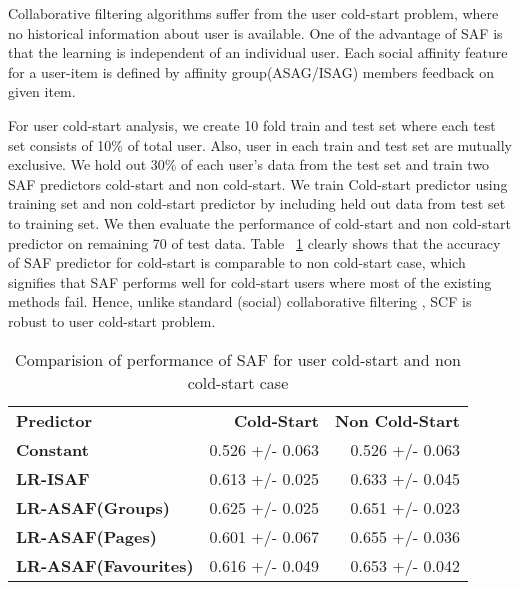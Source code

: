 Collaborative filtering algorithms suffer from the user cold-start problem,
where no historical information about user is available. One of the advantage of SAF is that 
the learning is independent of an individual user. Each social affinity feature for a user-item is
defined by affinity group(ASAG/ISAG) members feedback on given item. 

For user cold-start analysis, we create 10 fold train and test set where each test set
consists of 10\% of total user. Also, user in each train and test set are mutually exclusive.
We hold out 30\% of each user's data from the test set and train two SAF predictors cold-start and non cold-start.
We train Cold-start predictor using training set  and non cold-start predictor by including held out data from test
set to training set. We then evaluate the performance of cold-start and non cold-start predictor on remaining 70%
of test data. Table ~\ref{tab:coldstart} clearly shows that the accuracy of  SAF predictor for cold-start is comparable
to non cold-start case, which signifies that SAF performs well for cold-start users where most of the
existing methods fail. Hence, unlike standard (social) collaborative filtering , SCF is robust to user 
cold-start problem.  

 
\begin{table}[t!]
\centering
\begin{tabular}{|>{\small}l|>{\small}r|>{\small}r|}
\hline
& \multicolumn{2}{|c|}{\textbf{Accuracy}}\\
\hline
\textbf{Predictor}& \textbf{Cold-Start} & \textbf{Non Cold-Start}\\
\hline
\textbf{Constant} & 0.526  +/-  0.063 & 0.526  +/-  0.063 \\
\hline
\textbf{LR-ISAF} & 0.613 +/- 0.025 & 0.633  +/-  0.045 \\
\hline
\textbf{LR-ASAF(Groups)} & 0.625  +/-  0.025 & 0.651  +/-  0.023 \\
\hline
\textbf{LR-ASAF(Pages)} & 0.601  +/-  0.067 & 0.655  +/-  0.036 \\
\hline
\textbf{LR-ASAF(Favourites)} & 0.616  +/-  0.049 & 0.653  +/-  0.042\\
\hline
\end{tabular}
\caption{Comparision of performance of SAF for user cold-start and non cold-start case}
\label{tab:coldstart}
\end{table}